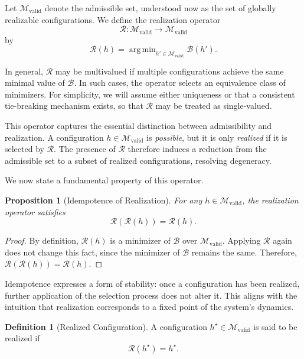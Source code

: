 \documentclass[11pt]{article}
\theoremstyle{plain}
\newtheorem{proposition}[theorem]{Proposition}
\theoremstyle{definition}
\newtheorem{definition}[theorem]{Definition}
\theoremstyle{remark}
\DeclareMathOperator{\argmin}{arg\,min}
\begin{document}
Let $\mathcal{M}_{\mathrm{valid}}$ denote the admissible set, understood now as the set of globally realizable configurations. We define the realization operator
\[
\mathcal{R} : \mathcal{M}_{\mathrm{valid}} \rightarrow \mathcal{M}_{\mathrm{valid}}
\]
by
\[
\mathcal{R}(h) = \argmin_{h' \in \mathcal{M}_{\mathrm{valid}}} \mathcal{B}(h').
\]

In general, $\mathcal{R}$ may be multivalued if multiple configurations achieve the same minimal value of $\mathcal{B}$. In such cases, the operator selects an equivalence class of minimizers. For simplicity, we will assume either uniqueness or that a consistent tie-breaking mechanism exists, so that $\mathcal{R}$ may be treated as single-valued.

This operator captures the essential distinction between admissibility and realization. A configuration $h \in \mathcal{M}_{\mathrm{valid}}$ is \emph{possible}, but it is only \emph{realized} if it is selected by $\mathcal{R}$. The presence of $\mathcal{R}$ therefore induces a reduction from the admissible set to a subset of realized configurations, resolving degeneracy.

We now state a fundamental property of this operator.

\begin{proposition}[Idempotence of Realization]
For any $h \in \mathcal{M}_{\mathrm{valid}}$, the realization operator satisfies
\[
\mathcal{R}(\mathcal{R}(h)) = \mathcal{R}(h).
\]
\end{proposition}

\begin{proof}
By definition, $\mathcal{R}(h)$ is a minimizer of $\mathcal{B}$ over $\mathcal{M}_{\mathrm{valid}}$. Applying $\mathcal{R}$ again does not change this fact, since the minimizer of $\mathcal{B}$ remains the same. Therefore, $\mathcal{R}(\mathcal{R}(h)) = \mathcal{R}(h)$.
\end{proof}

Idempotence expresses a form of stability: once a configuration has been realized, further application of the selection process does not alter it. This aligns with the intuition that realization corresponds to a fixed point of the system's dynamics.

\begin{definition}[Realized Configuration]
A configuration $h^\star \in \mathcal{M}_{\mathrm{valid}}$ is said to be realized if
\[
\mathcal{R}(h^\star) = h^\star.
\]
\end{definition}
\end{document}
